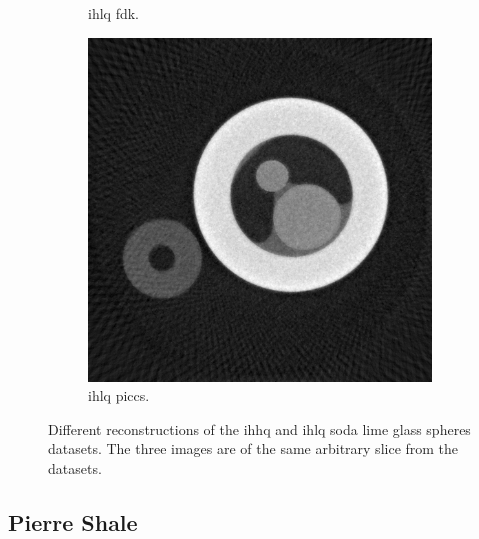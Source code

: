 \begin{figure}
\begin{subfigure}[t]{.31\textwidth}
      \caption{\gls{ihlq} \gls{fdk}.}
    \end{subfigure}
    \hfill  
    \begin{subfigure}[t]{.31\textwidth}
      \centering
      \includegraphics[width=\linewidth]{figures/kimrobertPICCS.png}
      \caption{\gls{ihlq} \gls{piccs}. }
    \end{subfigure}
    \caption[IHHQ and IHLQ soda lime glass spheres dataset]{Different reconstructions of the \gls{ihhq} and \gls{ihlq} soda lime glass spheres datasets. The three images are of the same arbitrary slice from the datasets. }
    \label{fig:kimrobertdatasets}
\end{figure}

\subsection{Pierre Shale}
\label{sec:method:datasets:shale}


